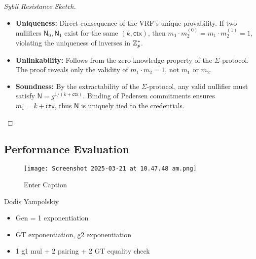 \begin{proof}[Sybil Resistance Sketch]
\begin{itemize}
    \item \textbf{Uniqueness:} Direct consequence of the VRF’s unique provability. If two nullifiers $\textsf{N}_0, \textsf{N}_1$ exist for the same $(k, \textsf{ctx})$, then $m_1 \cdot m_2^{(0)} = m_1 \cdot m_2^{(1)} = 1$, violating the uniqueness of inverses in $\mathbb{Z}_p^*$.
    
    \item \textbf{Unlinkability:} Follows from the zero-knowledge property of the $\Sigma$-protocol. The proof reveals only the validity of $m_1 \cdot m_2 = 1$, not $m_1$ or $m_2$.
    
    \item \textbf{Soundness:} By the extractability of the $\Sigma$-protocol, any valid nullifier must satisfy $\textsf{N} = g^{1/(k + \textsf{ctx})}$. Binding of Pedersen commitments ensures $m_1 = k + \textsf{ctx}$, thus $\textsf{N}$ is uniquely tied to the credentials.
\end{itemize}
\end{proof}

\subsection{Performance Evaluation}

\begin{figure}
    \centering
    \texttt{[image: Screenshot 2025-03-21 at 10.47.48 am.png]}
    \caption{Enter Caption}
\end{figure}


Dodis Yampolskiy
\begin{itemize}
    \item Gen = 1 exponentiation 
    \item GT exponentiation, g2 exponentiation 
    \item 1 g1 mul + 2 pairing + 2 GT equality check
\end{itemize}










